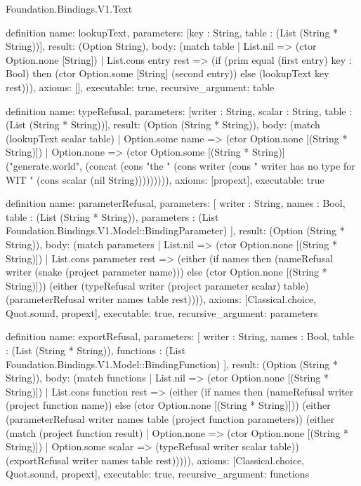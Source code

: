 \begin{lexlean}{Foundation.Bindings.V1.Text}
\begin{semanticmodule}
definition{
  name: lookupText,
  parameters: [key : String, table : (List (String * String))],
  result: (Option String),
  body: (match table
    | List.nil => (ctor Option.none [String])
    | List.cons entry rest => (if (prim equal (first entry) key : Bool) then (ctor Option.some [String] (second entry)) else (lookupText key rest))),
  axioms: [],
  executable: true,
  recursive_argument: table
}

definition{
  name: typeRefusal,
  parameters: [writer : String, scalar : String, table : (List (String * String))],
  result: (Option (String * String)),
  body: (match (lookupText scalar table)
    | Option.some name => (ctor Option.none [(String * String)])
    | Option.none => (ctor Option.some [(String * String)] ("generate.world", (concat (cons "the " (cons writer (cons " writer has no type for WIT " (cons scalar (nil String))))))))),
  axioms: [propext],
  executable: true
}

definition{
  name: parameterRefusal,
  parameters: [
    writer : String,
    names : Bool,
    table : (List (String * String)),
    parameters : (List Foundation.Bindings.V1.Model::BindingParameter)
  ],
  result: (Option (String * String)),
  body: (match parameters
    | List.nil => (ctor Option.none [(String * String)])
    | List.cons parameter rest => (either (if names then (nameRefusal writer (snake (project parameter name))) else (ctor Option.none [(String * String)])) (either (typeRefusal writer (project parameter scalar) table) (parameterRefusal writer names table rest)))),
  axioms: [Classical.choice, Quot.sound, propext],
  executable: true,
  recursive_argument: parameters
}

definition{
  name: exportRefusal,
  parameters: [
    writer : String,
    names : Bool,
    table : (List (String * String)),
    functions : (List Foundation.Bindings.V1.Model::BindingFunction)
  ],
  result: (Option (String * String)),
  body: (match functions
    | List.nil => (ctor Option.none [(String * String)])
    | List.cons function rest => (either (if names then (nameRefusal writer (project function name)) else (ctor Option.none [(String * String)])) (either (parameterRefusal writer names table (project function parameters)) (either (match (project function result)
      | Option.none => (ctor Option.none [(String * String)])
      | Option.some scalar => (typeRefusal writer scalar table)) (exportRefusal writer names table rest))))),
  axioms: [Classical.choice, Quot.sound, propext],
  executable: true,
  recursive_argument: functions
}


\end{semanticmodule}
\end{lexlean}
